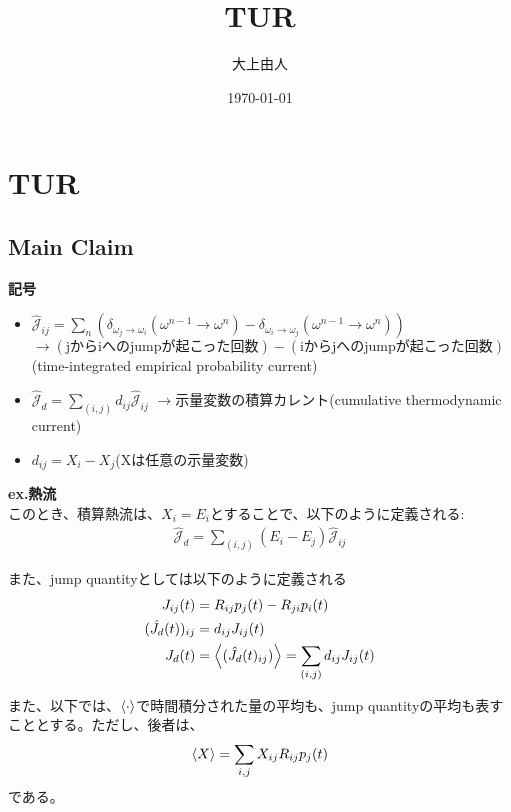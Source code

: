 \documentclass[a4paper,11pt]{jsarticle}
\numberwithin{equation}{section}
\begin{document}
\title{TUR}
\author{大上由人}
\date{\today}
\maketitle

\section{TUR}
\subsection{Main Claim}
\textbf{記号}
\begin{itemize}
    \item $\hat{\mathcal{J}}_{ij} = \sum_{n} (\delta_{\omega_j \to \omega_i}(\omega^{n-1}\to \omega^n) - \delta_{\omega_i \to \omega_j}(\omega^{n-1}\to \omega^n))$\\
$\to (\text{jからiへのjumpが起こった回数})-(\text{iからjへのjumpが起こった回数})$(time-integrated empirical probability current)\\
    \item $\hat{\mathcal{J}}_{d} = \sum_{(i,j)} d_{ij} \hat{\mathcal{J}}_{ij}$
$\to$示量変数の積算カレント(cumulative thermodynamic current)
    \item $d_{ij} = X_i - X_j$(Xは任意の示量変数)
\end{itemize}

\textbf{ex.熱流}\\
このとき、積算熱流は、$X_i = E_i$とすることで、以下のように定義される:
\begin{align}
    \hat{\mathcal{J}}_{d} = \sum_{(i,j)} (E_i - E_j) \hat{\mathcal{J}}_{ij}
\end{align}

また、jump quantityとしては以下のように定義される\\
\begin{align}
    {J}_{ij}(t) &= R_{ij}p_j(t) - R_{ji}p_i(t)\\
    (\hat{J}_{d}(t))_{ij} &= d_{ij} {J}_{ij}(t)\\
    J_{d}(t) &= \ev{(\hat{J}_{d}(t)_{ij})} = \sum_{(i,j)} d_{ij} {J}_{ij}(t)
\end{align}

また、以下では、$\ev{\cdot}$で時間積分された量の平均も、jump quantityの平均も表すこととする。ただし、後者は、
\begin{align}
    \ev{X} = \sum_{i,j} X_{ij} R_{ij}p_j(t)
\end{align}
である。\\
\end{document}
